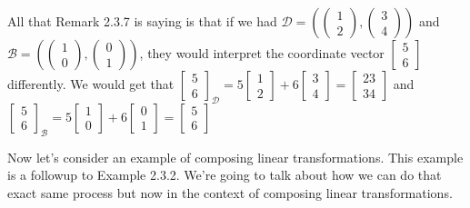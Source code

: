 \begin{example}
        All that Remark 2.3.7 is saying is that if we had $\mathcal{D}=(\begin{pmatrix}
        1 \\ 2
    \end{pmatrix}, \begin{pmatrix}
        3 \\ 4
    \end{pmatrix})$ and $\mathcal{B}=(\begin{pmatrix}
        1 \\ 0
    \end{pmatrix}, \begin{pmatrix}
        0 \\ 1
    \end{pmatrix})$, they would interpret the coordinate vector $\begin{bmatrix}
        5 \\ 6
    \end{bmatrix}$ differently. We would get that $\begin{bmatrix}
        5 \\ 6
    \end{bmatrix}_\mathcal{D}=5\begin{bmatrix}
        1 \\ 2
    \end{bmatrix}+6\begin{bmatrix}
        3 \\ 4
    \end{bmatrix}=\begin{bmatrix}
        23 \\ 34
    \end{bmatrix}$ and $\begin{bmatrix}
        5 \\ 6
    \end{bmatrix}_\mathcal{B}=5\begin{bmatrix}
        1 \\ 0
    \end{bmatrix}+6\begin{bmatrix}
        0 \\ 1
    \end{bmatrix}=\begin{bmatrix}
        5 \\ 6
    \end{bmatrix}$
\end{example}
Now let's consider an example of composing linear transformations. This example is a followup to Example 2.3.2. We're going to talk about how we can do that exact same process but now in the context of composing linear transformations.
